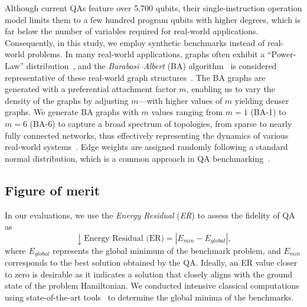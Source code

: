Although current QAs feature over 5,700 qubits, their single-instruction operation model limits them to a few hundred program qubits with higher degrees, which is far below the number of variables required for real-world applications. 
Consequently, in this study, we employ synthetic benchmarks instead of real-world problems. 
In many real-world applications, graphs often exhibit a ``Power-Law'' distribution~\cite{agler2016microbial,clauset2016colorado,gamermann2019comprehensive,goh2002classification,house2015testing,mislove2007measurement,pastor2015epidemic}, 
and the \emph{Barabasi--Albert} (BA) algorithm~\cite{albert2005scale,barabasi1999emergence} is considered representative of these real-world graph structures~\cite{ayanzadeh2023frozenqubits,barabasi2000scale,gray2018super,kim2022sparsity,lusseau2003emergent,wang2019complex,zadorozhnyi2012structural,zbinden2020embedding}. 
The BA graphs are generated with a preferential attachment factor $m$, enabling us to vary the density of the graphs by adjusting $m$---with higher values of $m$ yielding denser graphs. 
We generate BA graphs with $m$ values ranging from $m=1$ (BA-1)  to $m=6$ (BA-6) to capture a broad spectrum of topologies, from sparse to nearly fully connected networks, thus effectively representing the dynamics of various real-world systems~\cite{clauset2016colorado}. 
Edge weights are assigned randomly following a standard normal distribution, which is a common approach in QA benchmarking~\cite{das2008colloquium,ayanzadeh2022equal,ayanzadeh2021multi}.



\subsection{Figure of merit}

In our evaluations, we use the \emph{Energy Residual} (\emph{ER}) to assess the fidelity of QA as 
\begin{equation}	
	\downarrow \textrm{Energy Residual (ER)} = \left| E_{min} - E_{global} \right|,
	\label{eq:ER}
\end{equation}	
where $E_{global}$ represents the global minimum of the benchmark problem, and $E_{min}$ corresponds to the best solution obtained by the QA.
Ideally, an ER value closer to zero is desirable as it indicates a solution that closely aligns with the ground state of the problem Hamiltonian.
We conducted intensive classical computations using state-of-the-art tools~\cite{ayanzadeh_ramin_2021_5142230} to determine the global minima of the benchmarks.
